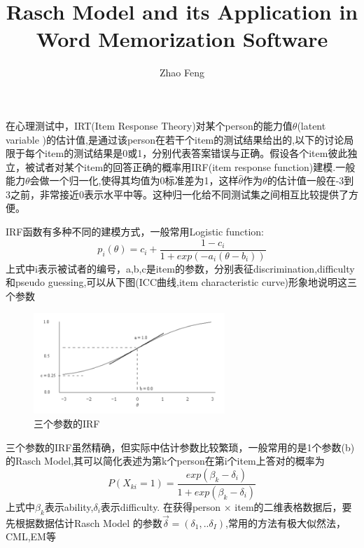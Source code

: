\documentclass[xetex,mathserif,serif]{beamer}
\begin{document}
\title[Crisis] %
{Rasch Model and its Application in Word Memorization Software}
\author[Author, Anders] %
{Zhao Feng}
\frame{\titlepage}
  \begin{frame}
    
    在心理测试中，IRT(Item Response Theory)对某个person的能力值$\theta$(latent variable )的估计值,是通过该person在若干个item的测试结果给出的,以下的讨论局限于每个item的测试结果是0或1，分别代表答案错误与正确。假设各个item彼此独立，被试者对某个item的回答正确的概率用IRF(item response function)建模.一般能力$\theta$会做一个归一化,使得其均值为0标准差为1，这样$\hat{\theta}$作为$\theta$的估计值一般在-3到3之前，非常接近0表示水平中等。这种归一化给不同测试集之间相互比较提供了方便。
  \end{frame}
  \begin{frame}
    
    IRF函数有多种不同的建模方式，一般常用Logistic function:
\pause\begin{equation}
p_i(\theta)=c_i+\frac{1-c_i}{1+exp(-a_i(\theta-b_i))}
\end{equation}
上式中i表示被试者的编号，a,b,c是item的参数，分别表征discrimination,difficulty和pseudo guessing,可以从下图(ICC曲线,item characteristic curve)形象地说明这三个参数
\begin{figure}[!ht]
\caption{三个参数的IRF}
\includegraphics[height=1.5in]{3PL_IRF.png}
\end{figure}

  \end{frame}
  \begin{frame}
    
    三个参数的IRF虽然精确，但实际中估计参数比较繁琐，一般常用的是1个参数(b)的Rasch Model,其可以简化表述为第k个person在第i个item上答对的概率为
\pause\begin{equation}\label{eq:Rasch}
P(X_{ki}=1)=\frac{exp(\beta_k-\delta_i)}{1+exp(\beta_k-\delta_i)}
\end{equation}
上式中$\beta_k$表示ability,$\delta_i$表示difficulty.
在获得person $\times$ item的二维表格数据后，要先根据数据估计Rasch Model 的参数$\vec{\delta}=(\delta_1,..\delta_I)$,常用的方法有极大似然法，CML,EM等
  \end{frame}
\end{document}

